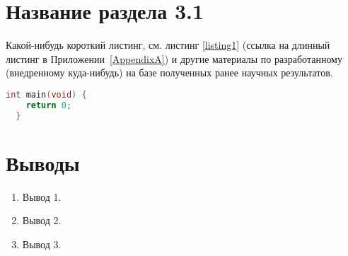
\begin{singlespace}
   \label{chapt3}
\end{singlespace}

\section{Название раздела 3.1} \label{sect3_1}

Какой-нибудь короткий листинг, см. листинг \ref{listing1} (ссылка на
длинный листинг в Приложении~\ref{AppendixA}) и другие материалы по
разработанному (внедренному куда-нибудь) на базе полученных ранее
научных результатов.

\begin{lstlisting}[language=C,label=listing1,caption=Пример короткого
  листинга на языке C (\textbf{blank.c})]
  int main(void) {
    return 0;
  }
\end{lstlisting}


\section{Выводы} \label{sect3_2}

\begin{enumerate}
\item Вывод 1.
\item Вывод 2.
\item Вывод 3.
\end{enumerate}

